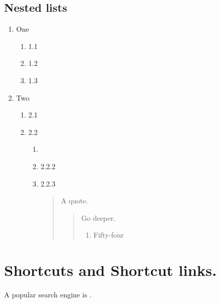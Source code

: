 \subsection{\label{nested-lists}Nested lists}
\begin{enumerate}
\item
\par One
\begin{enumerate}
\item
\par 1.1 \item
\par 1.2 \item
\par 1.3
\end{enumerate}
\par \item
\par Two
\begin{enumerate}
\item
\par 2.1 \item
\par 2.2
\begin{enumerate}
\item
\par {} \item
\par 2.2.2 \item
\par 2.2.3
\begin{quote}
\par A quote.
\begin{quote}
\par Go deeper.
\begin{enumerate}
\item
\par Fifty-four
\end{enumerate}
\end{quote}
\end{quote}
\end{enumerate}
\end{enumerate}
\end{enumerate}
\section{\label{shortcuts-and-shortcut-links.}Shortcuts and Shortcut links.}
\par A popular search engine is \href{www.google.com}{}.
